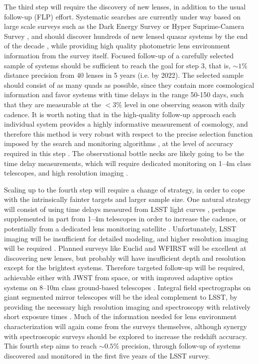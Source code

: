 The third step will require the discovery of new lenses, in addition
to the usual follow-up (FLP) effort. Systematic searches are currently
under way based on large scale surveys such as the Dark Energy Survey
or Hyper Suprime-Camera Survey \citep{Agn++15,Mor++16}, and should
discover hundreds of new lensed quasar systems by the end of the
decade \citep{O+M10}, while providing high quality photometric lens
environment information from the survey itself.  Focused follow-up of
a carefully selected sample of systems should be sufficient to reach
the goal for step 3, that is, $\sim1\%$ distance precision from 40
lenses in 5 years (i.e. by 2022). The selected sample should consist
of as many quads as possible, since they contain more cosmological
information and favor systems with time delays in the range 50-150
days, such that they are measurable at the $<3\%$ level in one
observing season with daily cadence. It is worth noting that in the
high-quality follow-up approach each individual system provides a
highly informative measurement of cosmology, and therefore this method
is very robust with respect to the precise selection function imposed
by the search and monitoring algorithms \citep{C+C16}, at the level of
accuracy required in this step . The observational bottle necks are
likely going to be the time delay measurements, which will require
dedicated monitoring on 1--4m class telescopes, and high resolution
imaging \citep{Tre++13}.

Scaling up to the fourth step will require a change of strategy, in
order to cope with the intrinsically fainter targets and larger sample
size. One natural strategy will consist of using time delays measured
from LSST light curves \citep{LiaoEtal2015}, perhaps supplemented in
part from 1--4m telescopes in order to increase the cadence, or potentially
from a dedicated lens monitoring satellite
\citep{Mou++08}. Unfortunately, LSST imaging will be insufficient for
detailed modeling, and higher resolution imaging will be required
\citep{Men++15}.
Planned surveys like Euclid and WFIRST will be excellent at
discovering new lenses, but probably will have insufficient depth and
resolution except for the brightest systems. Therefore targeted
follow-up will be required, achievable either with JWST from space, or
with improved adaptive optics systems on 8--10m class ground-based
telescopes \citep{Mar++07,Che++16,Rus++16}. Integral field
spectrographs on giant segmented mirror telescopes will be the ideal
complement to LSST, by providing the necessary high resolution imaging
and spectroscopy with relatively short exposure times
\citep[e.g.][]{Ski++15}.
Much of the information needed for lens environment characterization will again
come from the surveys themselves, although synergy with spectroscopic
surveys should be explored to increase the redshift accuracy.
This fourth step
aims to reach $\sim0.5\%$ precision, through follow-up of systems discovered
and monitored in the first five years of the LSST survey.

